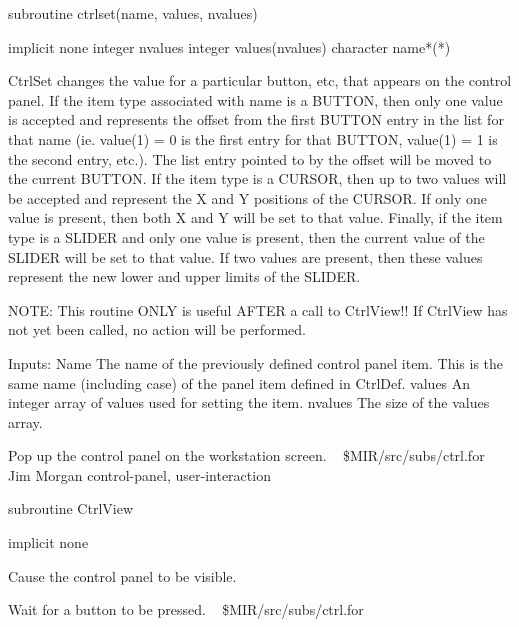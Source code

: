 \par{\tenpoint
{\eightpoint\begintt
      subroutine ctrlset(name, values, nvalues)

      implicit none
      integer nvalues
      integer values(nvalues)
      character name*(*)

  CtrlSet changes the value for a particular button, etc, that appears
  on the control panel.  If the item type associated with name is a
  BUTTON, then only one value is accepted and represents the offset
  from the first BUTTON entry in the list for that name (ie.
  value(1) = 0 is the first entry for that BUTTON, value(1) = 1
  is the second entry, etc.).  The list entry pointed to by the offset
  will be moved to the current BUTTON.  If the item type is a CURSOR,
  then up to two values will be accepted and represent the X and Y
  positions of the CURSOR.  If only one value is present, then both
  X and Y will be set to that value.  Finally, if the item type is a
  SLIDER and only one value is present, then the current value of the
  SLIDER will be set to that value.  If two values are present, then
  these values represent the new lower and upper limits of the SLIDER.

  NOTE: This routine ONLY is useful AFTER a call to CtrlView!!
  If CtrlView has not yet been called, no action will be performed.

  Inputs:
    Name     The name of the previously defined control panel item.
             This is the same name (including case) of the panel item
             defined in CtrlDef.
    values   An integer array of values used for setting the item.
    nvalues  The size of the values array.
\endtt}
\par}
%
\noindent Pop up the control panel on the workstation screen.
\newline \ 
\newline {} \$MIR/src/subs/ctrl.for
\newline {} Jim Morgan
\newline {} control-panel, user-interaction
\par{\tenpoint
{\eightpoint\begintt
        subroutine CtrlView

        implicit none

  Cause the control panel to be visible.
\endtt}
\par}
%
\noindent Wait for a button to be pressed.
\newline \ 
\newline {} \$MIR/src/subs/ctrl.for

